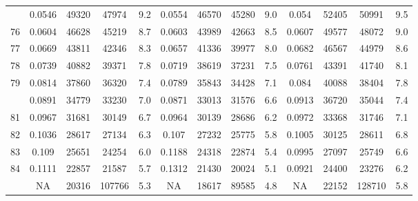 \documentclass[
  14pt,
]{article}
\begin{document}
\begin{longtable}[t]{lcccccccccccc}
\addlinespace
75 & 0.0546 & 49320 & 47974 & 9.2 & 0.0554 & 46570 & 45280 & 9.0 & 0.054 & 52405 & 50991 & 9.5\\
76 & 0.0604 & 46628 & 45219 & 8.7 & 0.0603 & 43989 & 42663 & 8.5 & 0.0607 & 49577 & 48072 & 9.0\\
77 & 0.0669 & 43811 & 42346 & 8.3 & 0.0657 & 41336 & 39977 & 8.0 & 0.0682 & 46567 & 44979 & 8.6\\
78 & 0.0739 & 40882 & 39371 & 7.8 & 0.0719 & 38619 & 37231 & 7.5 & 0.0761 & 43391 & 41740 & 8.1\\
79 & 0.0814 & 37860 & 36320 & 7.4 & 0.0789 & 35843 & 34428 & 7.1 & 0.084 & 40088 & 38404 & 7.8\\
\addlinespace
80 & 0.0891 & 34779 & 33230 & 7.0 & 0.0871 & 33013 & 31576 & 6.6 & 0.0913 & 36720 & 35044 & 7.4\\
81 & 0.0967 & 31681 & 30149 & 6.7 & 0.0964 & 30139 & 28686 & 6.2 & 0.0972 & 33368 & 31746 & 7.1\\
82 & 0.1036 & 28617 & 27134 & 6.3 & 0.107 & 27232 & 25775 & 5.8 & 0.1005 & 30125 & 28611 & 6.8\\
83 & 0.109 & 25651 & 24254 & 6.0 & 0.1188 & 24318 & 22874 & 5.4 & 0.0995 & 27097 & 25749 & 6.6\\
84 & 0.1111 & 22857 & 21587 & 5.7 & 0.1312 & 21430 & 20024 & 5.1 & 0.0921 & 24400 & 23276 & 6.2\\
\addlinespace
85 & NA & 20316 & 107766 & 5.3 & NA & 18617 & 89585 & 4.8 & NA & 22152 & 128710 & 5.8\\*
\end{longtable}
\end{document}
